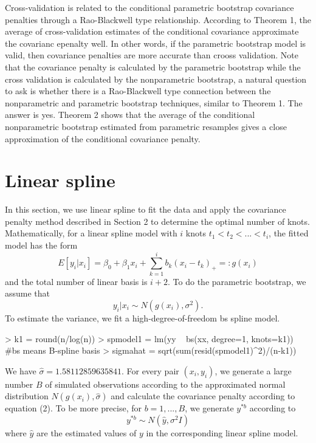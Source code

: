 \documentclass[12pt]{article}
\begin{document}
Cross-validation is related to the conditional parametric bootstrap covariance penalties through a Rao-Blackwell type relationship. According to Theorem 1, the average of cross-validation estimates of the conditional covariance approximate the covarianc epenalty well. In other words, if the parametric bootstrap model is valid, then covariance penalties are more accurate than crooss validation. Note that the covariance penalty is calculated by the parametric bootstrap while the cross validation is calculated by the nonparametric bootstrap, a natural question to ask is whether there is a Rao-Blackwell type connection between the nonparametric and parametric bootstrap techniques, similar to Theorem 1. The answer is yes. Theorem 2 shows that the average of the conditional nonparametric bootstrap estimated from parametric resamples gives a close approximation of the conditional covariance penalty.

\section{Linear spline}
In this section, we use linear spline to fit the data and apply the covariance penalty method described in Section 2 to determine the optimal number of knots. Mathematically, for a linear spline model with $i$ knots $t_1<t_2<...<t_i$, the fitted model has the form
\[
E[y_i|x_i]=\beta_0+\beta_1x_i+\sum_{k=1}^{i}b_k(x_i-t_k)_{+}=:g(x_i)
\]
and the total number of linear basis is $i+2$. To do the parametric bootstrap, we assume that
\[
y_i|x_i\sim N(g(x_i),\sigma^2).
\]
To estimate the variance, we fit a high-degree-of-freedom bs spline model.
\begin{Schunk}
\begin{Sinput}
> k1 = round(n/log(n))
> spmodel1 = lm(yy ~ bs(xx, degree=1, knots=k1)) #bs means B-spline basis
> sigmahat = sqrt(sum(resid(spmodel1)^2)/(n-k1))
\end{Sinput}
\end{Schunk}
We have $\widehat{\sigma}=1.58112859635841$. For every pair $(x_i,y_i)$, we generate a large number $B$ of simulated observations according to the approximated normal distribution $N(g(x_i),\widehat\sigma)$ and calculate the covariance penalty according to equation (2). To be more precise, for $b=1,...,B$, we generate $y^{*b}$ according to 
\[
y^{*b}\sim N(\widehat{y},\sigma^2I)
\]
where $\widehat{y}$ are the estimated values of $y$ in the corresponding linear spline model. 
\end{document}
